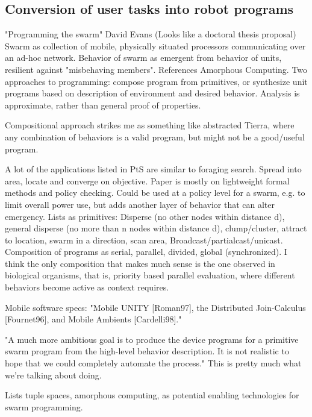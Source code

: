 \documentclass[]{article}
\begin{document}
\subsection{Conversion of user tasks into robot programs}

"Programming the swarm" \cite{evans2000programming} David Evans (Looks like a doctoral thesis proposal) Swarm as collection of mobile, physically situated processors communicating over an ad-hoc network. Behavior of swarm as emergent from behavior of units, resilient against "misbehaving members". References Amorphous Computing. Two approaches to programming: compose program from primitives, or synthesize unit programs based on description of environment and desired behavior. Analysis is approximate, rather than general proof of properties.

Compositional approach strikes me as something like abstracted Tierra, where any combination of behaviors is a valid program, but might not be a good/useful program. 

A lot of the applications listed in PtS are similar to foraging search. Spread into area, locate and converge on objective. Paper is mostly on lightweight formal methods and policy checking. Could be used at a policy level for a swarm, e.g. to limit overall power use, but adds another layer of behavior that can alter emergency. Lists as primitives: Disperse (no other nodes within distance d), general disperse (no more than n nodes within distance d), clump/cluster, attract to location, swarm in a direction, scan area, Broadcast/partialcast/unicast. Composition of programs as serial, parallel, divided, global (synchronized). I think the only composition that makes much sense is the one observed in biological organisms, that is, priority based parallel evaluation, where different behaviors become active as context requires. 

Mobile software specs: "Mobile UNITY [Roman97], the Distributed Join-Calculus [Fournet96], and Mobile Ambients [Cardelli98]."

"A much more ambitious goal is to produce the device programs for a primitive swarm program from the high-level behavior description. It is not realistic to hope that we could completely automate the process." This is pretty much what we're talking about doing. 

Lists tuple spaces, amorphous computing, as potential enabling technologies for swarm programming. 
\end{document}
